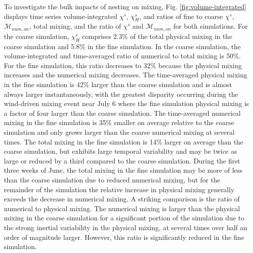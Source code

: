 To investigate the bulk impacts of nesting on mixing, Fig. \ref{fig:volume-integrated} displays time series volume-integrated $\chi^s$, $\chi_H^s$, and ratios of fine to coarse $\chi^s$, $\mathcal{M}_{num, on}$, total mixing, and the ratio of $\chi^s$ and $\mathcal{M}_{num, on}$ for both simulations. For the coarse simulation, $\chi_H^s$ comprises 2.3$\%$ of the total physical mixing in the coarse simulation and 5.8$\%$ in the fine simulation. In the coarse simulation, the volume-integrated and time-averaged ratio of numerical to total mixing is 50$\%$. For the fine simulation, this ratio decreases to 32$\%$ because the physical mixing increases and the numerical mixing decreases. The time-averaged physical mixing in the fine simulation is 42$\%$ larger than the coarse simulation and is almost always larger instantaneously, with the greatest disparity occurring during the wind-driven mixing event near July 6 where the fine simulation physical mixing is a factor of four larger than the coarse simulation.  The time-averaged numerical mixing in the fine simulation is 35$\%$ smaller on average relative to the coarse simulation and only grows larger than the coarse numerical mixing at several times. The total mixing in the fine simulation is 14$\%$ larger on average than the coarse simulation, but exhibits large temporal variability and may be twice as large or reduced by a third compared to the coarse simulation. During the first three weeks of June, the total mixing in the fine simulation may be more of less than the coarse simulation due to reduced numerical mixing, but for the remainder of the simulation the relative increase in physical mixing generally exceeds the decrease in numerical mixing. A striking comparison is the ratio of numerical to physical mixing. The numerical mixing is larger than the physical mixing in the coarse simulation for a significant portion of the simulation due to the strong inertial variability in the physical mixing, at several times over half an order of magnitude larger. However, this ratio is significantly reduced in the fine simulation. 

